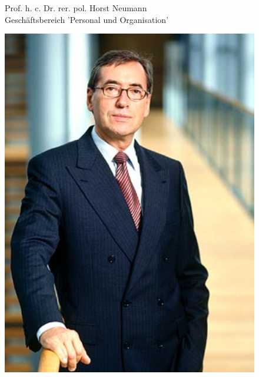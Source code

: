 \documentclass[12pt]{article}
\begin{document}
\begin{figure}[here!]
	\centering
	\begin{minipage}[h]{0.65\textwidth}
		Prof. h. c. Dr. rer. pol. Horst Neumann\\
		Geschäftsbereich 'Personal und Organisation'
	\end{minipage}
	\begin{minipage}[h]{0.10\textwidth}
		\hspace{1cm} 
	\end{minipage}
	\begin{minipage}[h]{0.20\textwidth}
		\centering
		\includegraphics[width=1.0\textwidth]{images/HorstNeumann.jpg}
		\label{fig:vorstandvw5}
		\cite{hmpic}
	\end{minipage}
\end{figure}
\end{document}
